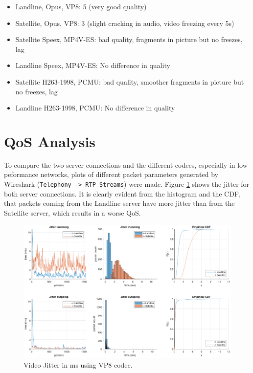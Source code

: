 \documentclass[parskip=full]{scrartcl}
\begin{document}
\begin{itemize}
	\item Landline, Opus, VP8: 5 (very good quality)
	\item Satellite, Opus, VP8: 3 (slight cracking in audio, video freezing every 5s)
	\item Satellite Speex, MP4V-ES: bad quality, fragments in picture but no freezes, lag
	\item Landline Speex, MP4V-ES: No difference in quality
	\item Satellite H263-1998, PCMU: bad quality, smoother fragments in picture but no freezes, lag
	\item Landline H263-1998, PCMU: No difference in quality
\end{itemize}

\section{QoS Analysis}
To compare the two server connections and the different codecs, especially in low peformance networks, plots of different packet parameters generated by Wireshark (\texttt{Telephony -> RTP Streams}) were made. 
Figure \ref{fig:vp8_jitter} shows the jitter for both server connections. 
It is clearly evident from the histogram and the CDF, that packets coming from the Landline server have more jitter than from the Satellite server, which results in a worse QoS.

\begin{figure}
    \centering
    \includegraphics[width=1\textwidth]{results/Video_VP8_Jitter.eps} 
    \caption{Video Jitter in ms using VP8 codec. }
    \label{fig:vp8_jitter}
\end{figure}
\end{document}
